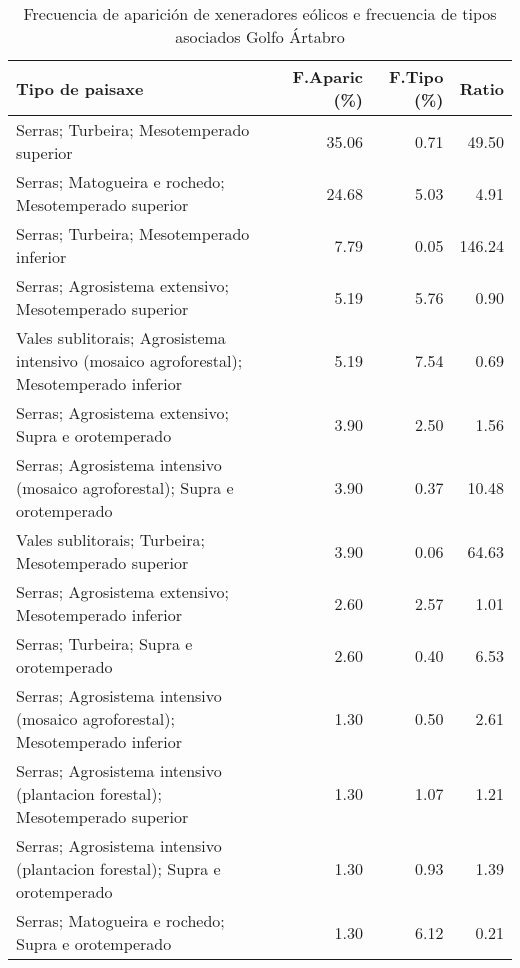 \begin{table}[p]
\centering
\caption{Frecuencia de aparición de xeneradores eólicos e frecuencia de tipos asociados Golfo Ártabro} 
\label{veolico1}
\begin{tabular}{lrrr}
  \hline
Tipo de paisaxe & F.Aparic (\%) & F.Tipo (\%) & Ratio \\ 
  \hline
Serras; Turbeira; Mesotemperado superior & 35.06 & 0.71 & 49.50 \\ 
  Serras; Matogueira e rochedo; Mesotemperado superior & 24.68 & 5.03 & 4.91 \\ 
  Serras; Turbeira; Mesotemperado inferior & 7.79 & 0.05 & 146.24 \\ 
  Serras; Agrosistema extensivo; Mesotemperado superior & 5.19 & 5.76 & 0.90 \\ 
  Vales sublitorais; Agrosistema intensivo (mosaico agroforestal); Mesotemperado inferior & 5.19 & 7.54 & 0.69 \\ 
  Serras; Agrosistema extensivo; Supra e orotemperado & 3.90 & 2.50 & 1.56 \\ 
  Serras; Agrosistema intensivo (mosaico agroforestal); Supra e orotemperado & 3.90 & 0.37 & 10.48 \\ 
  Vales sublitorais; Turbeira; Mesotemperado superior & 3.90 & 0.06 & 64.63 \\ 
  Serras; Agrosistema extensivo; Mesotemperado inferior & 2.60 & 2.57 & 1.01 \\ 
  Serras; Turbeira; Supra e orotemperado & 2.60 & 0.40 & 6.53 \\ 
  Serras; Agrosistema intensivo (mosaico agroforestal); Mesotemperado inferior & 1.30 & 0.50 & 2.61 \\ 
  Serras; Agrosistema intensivo (plantacion forestal); Mesotemperado superior & 1.30 & 1.07 & 1.21 \\ 
  Serras; Agrosistema intensivo (plantacion forestal); Supra e orotemperado & 1.30 & 0.93 & 1.39 \\ 
  Serras; Matogueira e rochedo; Supra e orotemperado & 1.30 & 6.12 & 0.21 \\ 
   \hline
\end{tabular}
\end{table}
